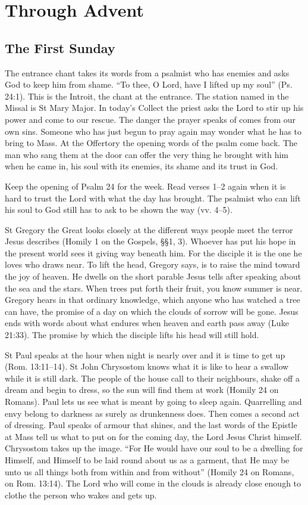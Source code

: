\section{Through Advent}

\subsection{The First Sunday}

The entrance chant takes its words from a psalmist who has enemies and asks
God to keep him from shame. “To thee, O Lord, have I lifted up my soul” (Ps.
24:1). This is the Introit, the chant at the entrance. The station named in
the Missal is St Mary Major. In today's Collect the priest
asks the Lord to stir up his power and
come to our rescue. The danger the prayer speaks of comes from our own sins.
Someone who has just begun to pray again may wonder what he has to bring
to Mass. At the Offertory the opening words of the psalm come back. The
man who sang them at the door can offer the very thing he brought with him
when he came in, his soul with its enemies, its shame and its trust in God.

Keep the opening of Psalm 24 for the week. Read verses 1--2 again
when it is hard to trust the Lord with what the day has brought.
The psalmist who can lift his soul to God still has to ask to be shown
the way (vv. 4--5).

St Gregory the Great looks closely at the different ways people meet the
terror Jesus describes (Homily 1 on the Gospels, §§1, 3). Whoever has put his
hope in the present world sees it giving way beneath him. For the disciple it
is the one he loves who draws near. To lift the head, Gregory says, is to
raise the mind toward the joy of heaven. He dwells on the short parable Jesus
tells after speaking about the sea and the stars. When trees put forth their
fruit, you know summer is near. Gregory hears in that ordinary knowledge,
which anyone who has watched a tree can have, the promise of a day on which
the clouds of sorrow will be gone. Jesus ends with words about what endures
when heaven and earth pass away (Luke 21:33). The promise by which the disciple lifts his head will still hold.

St Paul speaks at the hour when night is nearly over and it is time to get
up (Rom. 13:11--14). St John Chrysostom knows what it is like to hear a
swallow while it is still dark. The people of the house call to their
neighbours, shake off a dream and begin to dress, so the sun will find them
at work (Homily 24 on Romans). Paul lets us see what is meant by going to
sleep again. Quarrelling and envy belong to darkness as surely as
drunkenness does. Then comes a second act of dressing. Paul speaks of armour
that shines, and the last words of the Epistle at Mass tell us what to put on
for the coming day, the Lord Jesus Christ himself. Chrysostom takes up
the image. “For He would have our soul to be a dwelling for Himself,
and Himself to be laid round about us as a garment, that He may be unto
us all things both from within and from without” (Homily 24 on Romans,
on Rom. 13:14). The Lord who will come in the clouds is already close
enough to clothe the person who wakes and gets up.

